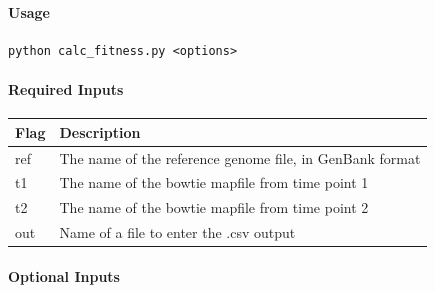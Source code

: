 \documentclass[11pt,]{article}
\let\oldparagraph\paragraph
\renewcommand{\paragraph}[1]{\oldparagraph{#1}\mbox{}}
\begin{document}
\paragraph{Usage}\label{usage}

\begin{verbatim}
python calc_fitness.py <options>
\end{verbatim}

\paragraph{Required Inputs}\label{required-inputs}

\begin{longtable}[]{@{}ll@{}}
\toprule
Flag & Description\tabularnewline
\midrule
\endhead
ref & The name of the reference genome file, in GenBank
format\tabularnewline
t1 & The name of the bowtie mapfile from time point 1\tabularnewline
t2 & The name of the bowtie mapfile from time point 2\tabularnewline
out & Name of a file to enter the .csv output\tabularnewline
\bottomrule
\end{longtable}

\paragraph{Optional Inputs}\label{optional-inputs}
\end{document}
